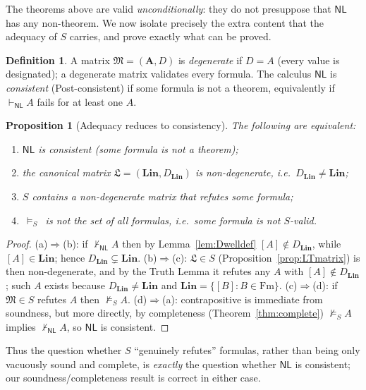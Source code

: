 \documentclass[12pt]{article}
\newtheorem{proposition}{Proposition}
\theoremstyle{definition}
\newtheorem{definition}{Definition}
\newcommand{\NL}{\mathsf{NL}}
\newcommand{\prv}{\vdash_{\NL}}
\newcommand{\vld}{\vDash}
\newcommand{\Fm}{\mathrm{Fm}}
\newcommand{\A}{\mathbf{A}}
\newcommand{\Lin}{\mathbf{Lin}}
\begin{document}
The theorems above are valid \emph{unconditionally}: they do not presuppose that
$\NL$ has any non-theorem. We now isolate precisely the extra content that the
adequacy of $S$ carries, and prove exactly what can be proved.

\begin{definition}
A matrix $\mathfrak M=(\A,D)$ is \emph{degenerate} if $D=A$ (every value is
designated); a degenerate matrix validates every formula. The calculus $\NL$ is
\emph{consistent} (Post-consistent) if some formula is not a theorem, equivalently
if $\prv A$ fails for at least one $A$.
\end{definition}

\begin{proposition}[Adequacy reduces to consistency]\label{prop:nontriv}
The following are equivalent:
\begin{enumerate}
\item[(a)] $\NL$ is consistent (some formula is not a theorem);
\item[(b)] the canonical matrix $\mathfrak L=(\Lin,D_{\Lin})$ is non-degenerate,
i.e.\ $D_{\Lin}\neq\Lin$;
\item[(c)] $S$ contains a non-degenerate matrix that refutes some formula;
\item[(d)] $\,\vld_{S}\,$ is not the set of \emph{all} formulas, i.e.\ some
formula is not $S$-valid.
\end{enumerate}
\end{proposition}

\begin{proof}
(a)$\Rightarrow$(b): if $\not\prv A$ then by Lemma~\ref{lem:Dwelldef}
$[A]\notin D_{\Lin}$, while $[A]\in\Lin$; hence $D_{\Lin}\subsetneq\Lin$.
(b)$\Rightarrow$(c): $\mathfrak L\in S$ (Proposition~\ref{prop:LTmatrix}) is then
non-degenerate, and by the Truth Lemma it refutes any $A$ with
$[A]\notin D_{\Lin}$; such $A$ exists because $D_{\Lin}\neq\Lin$ and
$\Lin=\{[B]:B\in\Fm\}$. (c)$\Rightarrow$(d): if $\mathfrak M\in S$ refutes $A$
then $\not\vld_{S}A$. (d)$\Rightarrow$(a): contrapositive is immediate from
soundness, but more directly, by completeness (Theorem~\ref{thm:complete})
$\not\vld_{S}A$ implies $\not\prv A$, so $\NL$ is consistent.
\end{proof}

Thus the question whether $S$ ``genuinely refutes'' formulas, rather than being
only vacuously sound and complete, is \emph{exactly} the question whether $\NL$
is consistent; our soundness/completeness result is correct in either case.
\end{document}

